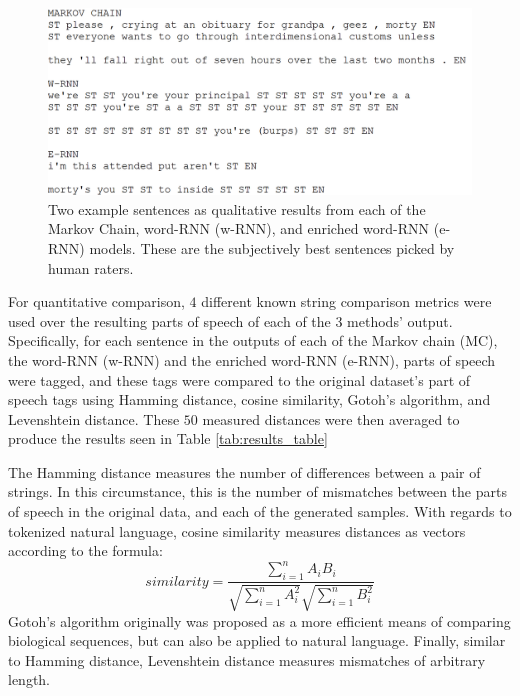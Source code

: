 \documentclass[conference]{IEEEtran}
\begin{document}
\begin{figure}[ht]
\caption{Two example sentences as qualitative results from each of the Markov Chain, word-RNN (w-RNN), and enriched word-RNN (e-RNN) models. These are the subjectively best sentences picked by human raters.}
\label{fig:qual_results}
\centering
\vspace{2mm}
\includegraphics[scale=0.2]{qualitative_examples}
\end{figure}

For quantitative comparison, $4$ different known string comparison metrics\cite{cohen2003comparison} were used over the resulting parts of speech of each of the $3$ methods' output.  Specifically, for each sentence in the outputs of each of the Markov chain (MC), the word-RNN (w-RNN) and the enriched word-RNN (e-RNN), parts of speech were tagged, and these tags were compared to the original dataset's part of speech tags using Hamming distance\cite{norouzi2012hamming}, cosine similarity\cite{cohen2003comparison}, Gotoh's algorithm\cite{gotoh1982improved}, and Levenshtein distance\cite{yujian2007normalized}.  These $50$ measured distances were then averaged to produce the results seen in Table \ref{tab:results_table}

The Hamming distance measures the number of differences between a pair of strings. In this circumstance, this is the number of mismatches between the parts of speech in the original data, and each of the generated samples. With regards to tokenized natural language, cosine similarity measures distances as vectors according to the formula:
$$similarity = \frac{\sum_{i=1}^{n}A_iB_i}{\sqrt{\sum_{i=1}^{n}A_i^2}\sqrt{\sum_{i=1}^{n}B_i^2}} $$ Gotoh’s algorithm originally was proposed as a more efficient means of comparing biological sequences, but can also be applied to natural language. Finally, similar to Hamming distance, Levenshtein distance measures mismatches of arbitrary length.
\end{document}
